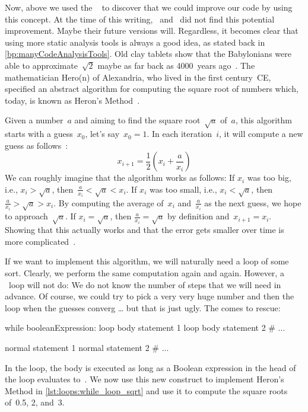 Now, above we used the \pylint\  to discover that we could improve our code by using this concept.
At the time of this writing, \ruff\ and \mypy\ did not find this potential improvement.
Maybe their future versions will.
Regardless, it becomes clear that using more static analysis tools is always a good idea, as stated back in \cref{bp:manyCodeAnalysisTools}.%
%
\FloatBarrier%
\endhsection%
%
%
\label{sec:whileLoop}%
%
Old clay tablets show that the Babylonians were able to approximate~$\sqrt{2}$ maybe as far back as 4000~years ago~\cite{FR1998SRAIOBMY7IC,S2011NA:NA}.
The mathematician Hero(n) of Alexandria, who lived in the first century~CE, specified an abstract algorithm for computing the square root of numbers which, today, is known as Heron's Method~\cite{S2011NA:NA,K2009BMOCTSRJBOFTAOCC}.

Given a number~$a$ and aiming to find the square root~$\sqrt{a}$ of~$a$, this algorithm starts with a guess~$x_0$, let's say~$x_0=1$.
In each iteration~$i$, it will compute a new guess as follows~\cite{S2011NA:NA,K2009BMOCTSRJBOFTAOCC}:%
%
\begin{equation}%
x_{i+1}=\frac{1}{2}\left(x_i+\frac{a}{x_i}\right)%
\label{eq:heronGuessUpdate}%
\end{equation}%
%
We can roughly imagine that the algorithm works as follows:
If $x_i$ was too big, i.e., $x_i>\sqrt{a}$, then~$\frac{a}{x_i}<\sqrt{a}<x_i$.
If $x_i$ was too small, i.e., $x_i<\sqrt{a}$, then $\frac{a}{x_i}>\sqrt{a}>x_i$.
By computing the average of~$x_i$ and~$\frac{a}{x_i}$ as the next guess, we hope to approach~$\sqrt{a}$.
If $x_i=\sqrt{a}$, then $\frac{a}{x_i}=\sqrt{a}$ by definition and~$x_{i+1}=x_i$.
Showing that this actually works and that the error gets smaller over time is more complicated~\cite{S2011NA:NA}.

If we want to implement this algorithm, we will naturally need a loop of some sort.
Clearly, we perform the same computation again and again.
However, a ~loop will not do:
We do not know the number of steps that we will need in advance.
Of course, we could try to pick a very very huge number and then  the loop when the guesses converg {\dots} but that is just ugly.
The  comes to rescue:%
%
\begin{pythonSyntax}
while booleanExpression:
    loop body statement 1
    loop body statement 2
    # ...

normal statement 1
normal statement 2
# ...
\end{pythonSyntax}
\FloatBarrier%
%
%
%
%
In the  loop, the body is executed as long as a Boolean expression in the head of the loop evaluates to~.
We now use this new construct to implement Heron's Method in \cref{lst:loops:while_loop_sqrt} and use it to compute the square roots of~0.5, 2, and~3.

